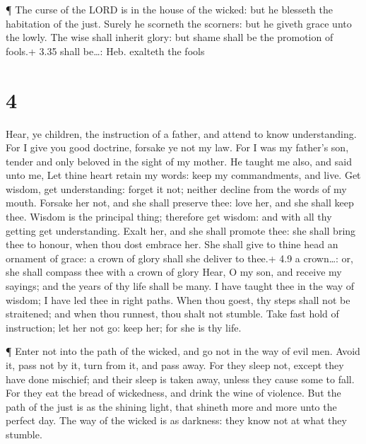  ¶ The curse of the LORD is in the house of the wicked: but
he blesseth the habitation of the just.  Surely he scorneth
the scorners: but he giveth grace unto the lowly.  The wise
shall inherit glory: but shame shall be the promotion of fools.+ 3.35
shall be\ldots: Heb. exalteth the fools

\hypertarget{section-3}{%
\section{4}\label{section-3}}

 Hear, ye children, the instruction of a father, and attend
to know understanding.  For I give you good doctrine,
forsake ye not my law.  For I was my father's son, tender
and only beloved in the sight of my mother.  He taught me
also, and said unto me, Let thine heart retain my words: keep my
commandments, and live.  Get wisdom, get understanding:
forget it not; neither decline from the words of my mouth. 
Forsake her not, and she shall preserve thee: love her, and she shall
keep thee.  Wisdom is the principal thing; therefore get
wisdom: and with all thy getting get understanding.  Exalt
her, and she shall promote thee: she shall bring thee to honour, when
thou dost embrace her.  She shall give to thine head an
ornament of grace: a crown of glory shall she deliver to thee.+ 4.9 a
crown\ldots: or, she shall compass thee with a crown of glory
 Hear, O my son, and receive my sayings; and the years of
thy life shall be many.  I have taught thee in the way of
wisdom; I have led thee in right paths.  When thou goest,
thy steps shall not be straitened; and when thou runnest, thou shalt not
stumble.  Take fast hold of instruction; let her not go:
keep her; for she is thy life.

 ¶ Enter not into the path of the wicked, and go not in the
way of evil men.  Avoid it, pass not by it, turn from it,
and pass away.  For they sleep not, except they have done
mischief; and their sleep is taken away, unless they cause some to fall.
 For they eat the bread of wickedness, and drink the wine
of violence.  But the path of the just is as the shining
light, that shineth more and more unto the perfect day. 
The way of the wicked is as darkness: they know not at what they
stumble.

